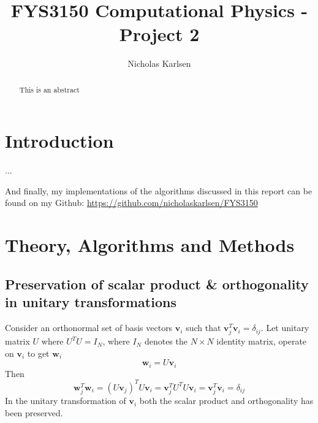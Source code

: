 \documentclass[10pt,showpacs,preprintnumbers,footinbib,amsmath,amssymb,aps,prl,twocolumn,groupedaddress,superscriptaddress,showkeys]{revtex4-1}
\begin{document}
\title{FYS3150 Computational Physics - Project 2}
\author{Nicholas Karlsen}

\begin{abstract}
  This is an abstract
\end{abstract}

\maketitle

\section{Introduction}
  ...

  And finally, my implementations of the algorithms discussed in this report can be found on my Github: \url{https://github.com/nicholaskarlsen/FYS3150}

\section{Theory, Algorithms and Methods}
  \subsection{Preservation of scalar product \& orthogonality in unitary transformations\label{subsec:preservation}}
    Consider an orthonormal set of basis vectors $\mathbf v_i$ such that $\mathbf v_j^T \mathbf v_i = \delta_{ij}$. Let unitary matrix $U$ where $U^T U= I_N$, where $I_N$ denotes the $N\times N$ identity matrix, operate on $\mathbf v_i$ to get $\mathbf w_i$
    \begin{equation}
      \mathbf w_i = U \mathbf v_i
    \end{equation}
    Then
    \begin{equation}
      \mathbf w_j^T\mathbf w_i = (U\mathbf v_j)^TU\mathbf v_i = \mathbf v_j^T U^T U \mathbf v_i
      = \mathbf v_j^T \mathbf v_i = \delta_{ij}
    \end{equation}
    In the unitary transformation of $\mathbf v_i$ both the scalar product and orthogonality has been preserved.
\end{document}

